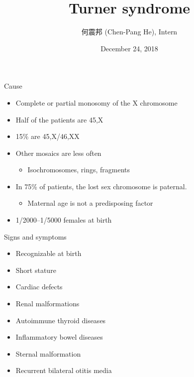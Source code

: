 \documentclass{beamer}
\title{Turner syndrome}
\author[Chen-Pang He]{何震邦 (Chen-Pang He), Intern}
\institute[CGH]{Cathay General Hospital}
\date{December 24, 2018}
\begin{document}
\maketitle

\begin{frame}{Cause}
    \begin{itemize}
        \item Complete or partial monosomy of the X chromosome
        \item Half of the patients are 45,X
        \item 15\% are 45,X/46,XX
        \item Other mosaics are less often
            \begin{itemize}
                \item Isochromosomes, rings, fragments
            \end{itemize}
        \item In 75\% of patients, the lost sex chromosome is paternal.
            \begin{itemize}
                \item Maternal age is not a predisposing factor
            \end{itemize}
        \item 1/2000--1/5000 females at birth
    \end{itemize}
\end{frame}

\begin{frame}{Signs and symptoms}
    \begin{itemize}
        \item Recognizable at birth
        \item Short stature
        \item Cardiac defects
        \item Renal malformations
        \item Autoimmune thyroid diseases
        \item Inflammatory bowel diseases
        \item Sternal malformation
        \item Recurrent bilateral otitis media
    \end{itemize}
\end{frame}
\end{document}
